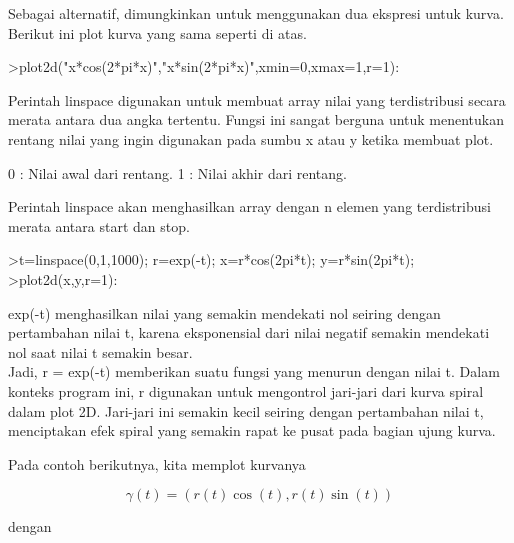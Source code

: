 \documentclass[a4paper,10pt]{article}
\begin{document}
\begin{eulernotebook}
\begin{eulercomment}
\begin{eulercomment}
\begin{eulercomment}
Sebagai alternatif, dimungkinkan untuk menggunakan dua ekspresi untuk
kurva. Berikut ini plot kurva yang sama seperti di atas.
\end{eulercomment}
\begin{eulerprompt}
>plot2d("x*cos(2*pi*x)","x*sin(2*pi*x)",xmin=0,xmax=1,r=1):
\end{eulerprompt}
\begin{eulercomment}
Perintah linspace digunakan untuk membuat array nilai yang
terdistribusi secara merata antara dua angka tertentu. Fungsi ini
sangat berguna untuk menentukan rentang nilai yang ingin digunakan
pada sumbu x atau y ketika membuat plot.

\end{eulercomment}
\begin{eulerttcomment}
    0  : Nilai awal dari rentang.
    1  : Nilai akhir dari rentang.
 
\end{eulerttcomment}
\begin{eulercomment}

Perintah linspace akan menghasilkan array dengan n elemen yang
terdistribusi merata antara start dan stop.
\end{eulercomment}
\begin{eulerprompt}
>t=linspace(0,1,1000); r=exp(-t); x=r*cos(2pi*t); y=r*sin(2pi*t);
>plot2d(x,y,r=1):
\end{eulerprompt}
\begin{eulercomment}
exp(-t) menghasilkan nilai yang semakin mendekati nol seiring dengan
pertambahan nilai t, karena eksponensial dari nilai negatif semakin
mendekati nol saat nilai t semakin besar.\\
Jadi, r = exp(-t) memberikan suatu fungsi yang menurun dengan nilai t.
Dalam konteks program ini, r digunakan untuk mengontrol jari-jari dari
kurva spiral dalam plot 2D. Jari-jari ini semakin kecil seiring dengan
pertambahan nilai t, menciptakan efek spiral yang semakin rapat ke
pusat pada bagian ujung kurva.





Pada contoh berikutnya, kita memplot kurvanya

\end{eulercomment}
\begin{eulerformula}
\[
\gamma(t) = (r(t) \cos(t), r(t) \sin(t))
\]
\end{eulerformula}
\begin{eulercomment}
dengan


\end{eulercomment}
\end{eulercomment}
\end{eulercomment}
\end{eulernotebook}
\end{document}
